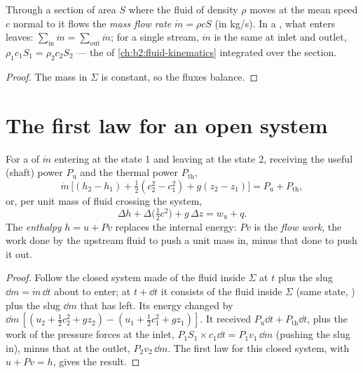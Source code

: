 \begin{proposition}\label{prop:b2:open-systems:mass}
Through a section of area $S$ where the fluid of density $\rho$ moves
at the mean speed $c$ normal to it flows the \emph{mass flow
rate} $\dot m = \rho c S$ (in \unit{kg/s}). In a
, what enters leaves: $\sum_{\text{in}}\dot m = \sum_{\text{out}}
\dot m$; for a single stream, $\dot m$ is the same at inlet and outlet,
$\rho_1c_1S_1 = \rho_2c_2S_2$ --- the  of
\cref{ch:b2:fluid-kinematics} integrated over the section.
\end{proposition}

\begin{proof}
The mass in $\Sigma$ is constant, so the fluxes balance.
\end{proof}

\section{The first law for an open system}

\begin{theorem}\label{thm:b2:open-systems:firstlaw}
For a  of  $\dot m$ entering at the state 1
and leaving at the state 2, receiving the useful (shaft) power
$P_{\text{u}}$ and the thermal power $P_{\text{th}}$,
\[
\dot m\,\Big[(h_2 - h_1) + \tfrac12(c_2^2 - c_1^2) + g(z_2 - z_1)\Big]
= P_{\text{u}} + P_{\text{th}} ,
\]
or, per unit mass of fluid crossing the system,
\[
\Delta h + \Delta\big(\tfrac12c^2\big) + g\,\Delta z = w_{\text{u}} + q .
\]
The \emph{enthalpy} $h = u + Pv$ replaces
the internal energy: $Pv$ is the \emph{flow work}, the work done by
the upstream fluid to push a unit mass in, minus that done to push it
out.
\end{theorem}

\begin{proof}
Follow the closed system made of the fluid inside $\Sigma$ at $t$ plus
the slug $\dd m = \dot m\,\dd t$ about to enter; at $t + \dd t$ it
consists of the fluid inside $\Sigma$ (same state, ) plus the
slug $\dd m$ that has left. Its energy changed by
$\dd m\,[(u_2 + \tfrac12c_2^2 + gz_2) - (u_1 + \tfrac12c_1^2 + gz_1)]$. It
received $P_{\text{u}}\dd t + P_{\text{th}}\dd t$, plus the work of the
pressure forces at the inlet, $P_1S_1 \times c_1\dd t = P_1v_1\,\dd m$
(pushing the slug in), minus that at the outlet, $P_2v_2\,\dd m$. The
first law for this closed system, with $u + Pv = h$, gives the result.
\end{proof}

